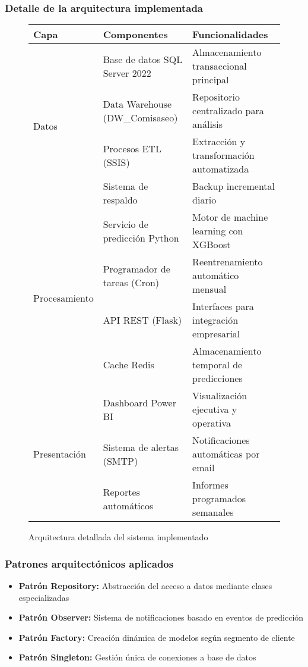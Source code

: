 \subsubsection{Detalle de la arquitectura implementada}

\begin{figure}[ht]
\centering
\begin{tabular}{|p{3cm}|p{4cm}|p{7cm}|}
\hline
\textbf{Capa} & \textbf{Componentes} & \textbf{Funcionalidades} \\
\hline
\multirow{4}{*}{Datos} & Base de datos SQL Server 2022 & Almacenamiento transaccional principal \\
\cline{2-3}
& Data Warehouse (DW\_Comisaseo) & Repositorio centralizado para análisis \\
\cline{2-3}
& Procesos ETL (SSIS) & Extracción y transformación automatizada \\
\cline{2-3}
& Sistema de respaldo & Backup incremental diario \\
\hline
\multirow{4}{*}{Procesamiento} & Servicio de predicción Python & Motor de machine learning con XGBoost \\
\cline{2-3}
& Programador de tareas (Cron) & Reentrenamiento automático mensual \\
\cline{2-3}
& API REST (Flask) & Interfaces para integración empresarial \\
\cline{2-3}
& Cache Redis & Almacenamiento temporal de predicciones \\
\hline
\multirow{3}{*}{Presentación} & Dashboard Power BI & Visualización ejecutiva y operativa \\
\cline{2-3}
& Sistema de alertas (SMTP) & Notificaciones automáticas por email \\
\cline{2-3}
& Reportes automáticos & Informes programados semanales \\
\hline
\end{tabular}
\caption{Arquitectura detallada del sistema implementado}
\end{figure}

\subsubsection{Patrones arquitectónicos aplicados}

\begin{itemize}
    \item \textbf{Patrón Repository:} Abstracción del acceso a datos mediante clases especializadas
    \item \textbf{Patrón Observer:} Sistema de notificaciones basado en eventos de predicción
    \item \textbf{Patrón Factory:} Creación dinámica de modelos según segmento de cliente
    \item \textbf{Patrón Singleton:} Gestión única de conexiones a base de datos
\end{itemize}

